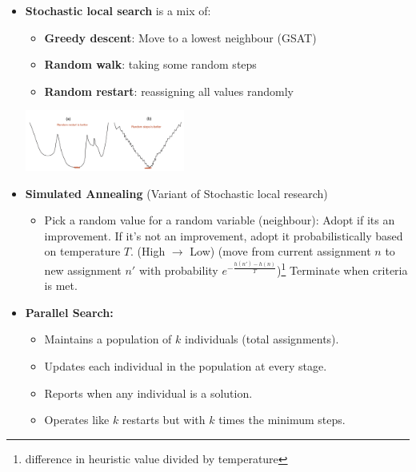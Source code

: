 \documentclass{article}
\theoremstyle{note}
\begin{document}
\begin{itemize}
   	\begin{itemize}
   		\item \textbf{Tabu lists}: 
   		\subitem Maintain a tabu list of $k$ last assignments to prevent cycling.
   		\subitem Reject assignments exist on tabu lists.\footnote{e.g: $k=1$ means reject assignment of the same value to the variable chosen.}
   		\subitem More efficient than a list of complete assignments, but expensive if $k$ is large.
   	\end{itemize}
   	\item \textbf{Stochastic local search} is a mix of: 
   	
   		\begin{minipage}{.59\linewidth}
   			\begin{itemize}
   	\item \textbf{Greedy descent}: Move to a lowest neighbour (GSAT)
   	\item \textbf{Random walk}: taking some random steps
   	\item \textbf{Random restart}: reassigning all values randomly
   	\end{itemize}
   		\end{minipage}
   		\hfill
   		\begin{minipage}{.5\linewidth}
  	\includegraphics[width=\linewidth, height=2cm]{RGSAT.png}
   		\end{minipage}
   	
   	
   	\item \textbf{Simulated Annealing} (Variant of Stochastic local research)
   	\begin{itemize}
   		\item Pick a random value for a random variable (neighbour):
   		\subitem  Adopt if its an improvement.
   		\subitem  If it's not an improvement, adopt it probabilistically based on temperature $T$. (High $\rightarrow$ Low)
   		\subitem (move from current assignment $n$ to new assignment $n'$ with probability $e^{-\frac{h(n')-h(n)}{T}}$)\footnote{difference in heuristic value divided by temperature}
   		\subitem Terminate when criteria is met.
   	\end{itemize}
   	
   	\item \textbf{Parallel Search:}
  \begin{itemize}
    \item Maintains a population of \( k \) individuals (total assignments).
    \item Updates each individual in the population at every stage.
    \item Reports when any individual is a solution.
    \item Operates like \( k \) restarts but with \( k \) times the minimum steps.
  \end{itemize}


\end{itemize}
\end{document}

